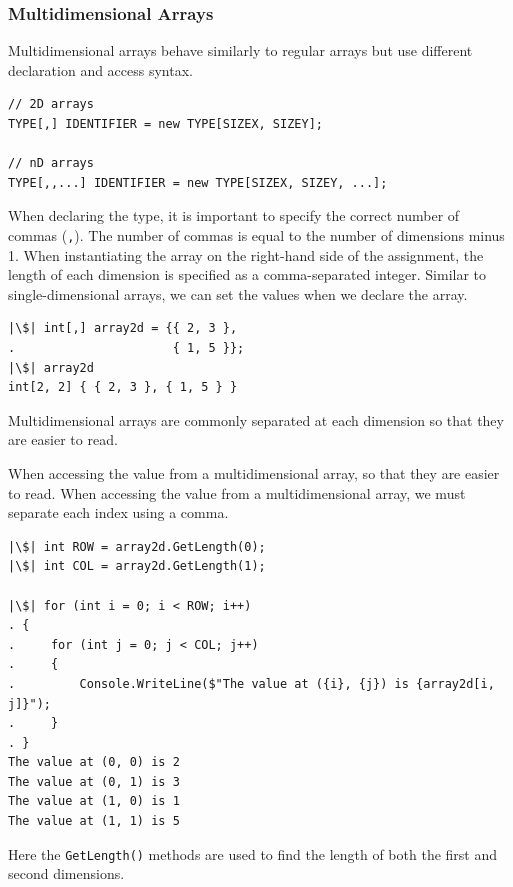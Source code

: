 \documentclass{article}
\begin{document}
\subsubsection{Multidimensional Arrays}
Multidimensional arrays behave similarly to regular arrays but use
different declaration and access syntax.
\begin{verbatim}
// 2D arrays
TYPE[,] IDENTIFIER = new TYPE[SIZEX, SIZEY];

// nD arrays
TYPE[,,...] IDENTIFIER = new TYPE[SIZEX, SIZEY, ...];
\end{verbatim}
When declaring the type, it is important to specify the correct number
of commas (\texttt{,}). The number of commas is equal to
the number of dimensions minus 1. When instantiating the array on the
right-hand side of the assignment, the length of each dimension is
specified as a comma-separated integer. Similar to single-dimensional
arrays, we can set the values when we declare the array.
\begin{verbatim}
|\$| int[,] array2d = {{ 2, 3 },
.                      { 1, 5 }};
|\$| array2d
int[2, 2] { { 2, 3 }, { 1, 5 } }
\end{verbatim}
Multidimensional arrays are commonly separated at each dimension so
that they are easier to read.

When accessing the value from a multidimensional array, so that they
are easier to read. When accessing the value from a multidimensional
array, we must separate each index using a comma.
\begin{verbatim}
|\$| int ROW = array2d.GetLength(0);
|\$| int COL = array2d.GetLength(1);

|\$| for (int i = 0; i < ROW; i++)
. {
.     for (int j = 0; j < COL; j++)
.     {
.         Console.WriteLine($"The value at ({i}, {j}) is {array2d[i, j]}");
.     }
. }
The value at (0, 0) is 2
The value at (0, 1) is 3
The value at (1, 0) is 1
The value at (1, 1) is 5
\end{verbatim}
Here the \texttt{GetLength()} methods are used to find the
length of both the first and second dimensions.
\end{document}

